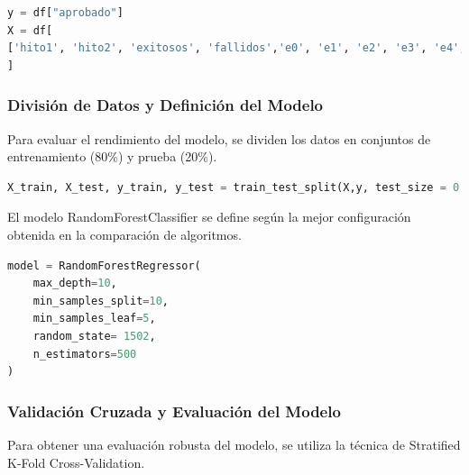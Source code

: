 \begin{lstlisting}[language=Python, caption=Selección de características y variable objetivo para RandomForestClassifier, label=lst:seleccion_caracteristicasRFC]
y = df["aprobado"]
X = df[
['hito1', 'hito2', 'exitosos', 'fallidos','e0', 'e1', 'e2', 'e3', 'e4', 'e5', 'e6', 'e7', 'e8', 'e9', 'e10', 'e11', 'e12', 'e13', 'e14', 'e15', 'e16', 'e17', 'e18', 'e19', 'e20', 'e21', 'e22', 'e23', 'e24', 'e25', 'e26', 'e27', 'e28', 'e29', 'e30', 'e31', 'e32', 'e33', 'e34', 'e35', 'e36', 'e37', 'e38', 'e39', 'e40', 'e41', 'e42', 'e43', 'e44', 'e45', 'e46', 'e47', 'e48', 'e49', 'e50', 'e51', 'e52']
]
\end{lstlisting}

\subsubsection{División de Datos y Definición del Modelo}

Para evaluar el rendimiento del modelo, se dividen los datos en conjuntos de entrenamiento (80\%) y prueba (20\%).

\begin{lstlisting}[language=Python, caption=División de datos para entrenamiento y prueba, label=lst:train_test_split_RFC]
X_train, X_test, y_train, y_test = train_test_split(X,y, test_size = 0.2,random_state= 1502)
\end{lstlisting}

El modelo RandomForestClassifier se define según la mejor configuración obtenida en la comparación de algoritmos.


\begin{lstlisting}[language=Python, caption=Definición del modelo RandomForestRegressor, label=lst:def_RFC]
model = RandomForestRegressor( 
    max_depth=10, 
    min_samples_split=10, 
    min_samples_leaf=5,
    random_state= 1502,
    n_estimators=500
)
\end{lstlisting}

\subsubsection{Validación Cruzada y Evaluación del Modelo}

Para obtener una evaluación robusta del modelo, se utiliza la técnica de Stratified K-Fold Cross-Validation.

